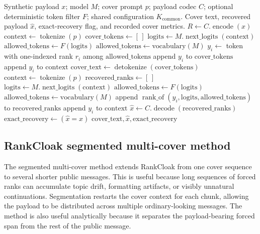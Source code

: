 \documentclass[fleqn,10pt]{wlscirep}
\newcommand{\RankOf}{\operatorname{rank\_of}}
\newcommand{\Encode}{\operatorname{encode}}
\newcommand{\Decode}{\operatorname{decode}}
\newcommand{\Tokenize}{\operatorname{tokenize}}
\newcommand{\Detokenize}{\operatorname{detokenize}}
\newcommand{\NextLogits}{\operatorname{next\_logits}}
\begin{document}
\begin{algorithm}[H]
\caption{Non-segmented RankCloak bounded-codec trial for encoding a displayed synthetic artifact as ranks, generating one cover token per rank, and recovering by exact-copy replay.}
\label{alg:nonseg}
\begin{algorithmic}[1]
\Require Synthetic payload \(x\); model \(M\); cover prompt \(p\); payload codec \(C\); optional deterministic token filter \(F\); shared configuration \(K_{\mathrm{common}}\).
\Ensure Cover text, recovered payload \(\hat{x}\), exact-recovery flag, and recorded cover metrics.
\State \(R \gets C.\Encode(x)\)
\State \(\mathrm{context} \gets \Tokenize(p)\)
\State \(\mathrm{cover\_tokens} \gets [\,]\)
    \State \(\mathrm{logits} \gets M.\NextLogits(\mathrm{context})\)
        \State \(\mathrm{allowed\_tokens} \gets F(\mathrm{logits})\)
    \Else
        \State \(\mathrm{allowed\_tokens} \gets \mathrm{vocabulary}(M)\)
    \EndIf
    \State \(y_i \gets\) token with one-indexed rank \(r_i\) among \(\mathrm{allowed\_tokens}\)
    \State append \(y_i\) to \(\mathrm{cover\_tokens}\)
    \State append \(y_i\) to \(\mathrm{context}\)
\EndFor
\State \(\mathrm{cover\_text} \gets \Detokenize(\mathrm{cover\_tokens})\)
\Statex
\State \(\mathrm{context} \gets \Tokenize(p)\)
\State \(\mathrm{recovered\_ranks} \gets [\,]\)
    \State \(\mathrm{logits} \gets M.\NextLogits(\mathrm{context})\)
        \State \(\mathrm{allowed\_tokens} \gets F(\mathrm{logits})\)
    \Else
        \State \(\mathrm{allowed\_tokens} \gets \mathrm{vocabulary}(M)\)
    \EndIf
    \State append \(\RankOf(y_i,\mathrm{logits},\mathrm{allowed\_tokens})\) to \(\mathrm{recovered\_ranks}\)
    \State append \(y_i\) to \(\mathrm{context}\)
\EndFor
\State \(\hat{x} \gets C.\Decode(\mathrm{recovered\_ranks})\)
\State \(\mathrm{exact\_recovery} \gets (\hat{x}=x)\)
\State \Return \(\mathrm{cover\_text}, \hat{x}, \mathrm{exact\_recovery}\)
\end{algorithmic}
\end{algorithm}



\subsection*{RankCloak segmented multi-cover method}

The segmented multi-cover method extends RankCloak from one cover sequence to several shorter public messages. This is useful because long sequences of forced ranks can accumulate topic drift, formatting artifacts, or visibly unnatural continuations. Segmentation restarts the cover context for each chunk, allowing the payload to be distributed across multiple ordinary-looking messages. The method is also useful analytically because it separates the payload-bearing forced span from the rest of the public message.
\end{document}
